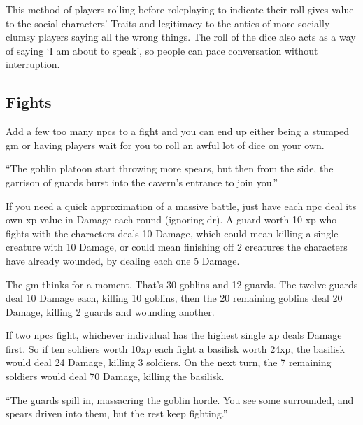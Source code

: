 \begin{multicols}{2}
This method of players rolling before roleplaying to indicate their roll gives value to the social characters' Traits and legitimacy to the antics of more socially clumsy players saying all the wrong things.
The roll of the dice also acts as a way of saying `I am about to speak', so people can pace conversation without interruption.

\subsection{ Fights}

Add a few too many \glspl{npc} to a fight and you can end up either being a stumped \gls{gm} or having players wait for you to roll an awful lot of dice on your own.

\begin{exampletext}

	``The goblin platoon start throwing more spears, but then from the side, the garrison of guards burst into the cavern's entrance to join you.''

\end{exampletext}

If you need a quick approximation of a massive battle, just have each \gls{npc} deal its own \gls{xp} value in Damage each round (ignoring \gls{dr}).
A guard worth 10 \gls{xp} who fights with the characters deals 10 Damage, which could mean killing a single creature with 10 Damage, or could mean finishing off 2 creatures the characters have already wounded, by dealing each one 5 Damage.

\begin{exampletext}

	The \gls{gm} thinks for a moment.
	That's 30 goblins and 12 guards.
	The twelve guards deal 10 Damage each, killing 10 goblins, then the 20 remaining goblins deal 20 Damage, killing 2 guards and wounding another.

\end{exampletext}

If two \glspl{npc} fight, whichever individual has the highest single \gls{xp} deals Damage first.
So if ten soldiers worth 10\gls{xp} each fight a basilisk worth 24\gls{xp}, the basilisk would deal 24 Damage, killing 3 soldiers.
On the next turn, the 7 remaining soldiers would deal 70 Damage, killing the basilisk.

\begin{exampletext}

	``The guards spill in, massacring the goblin horde.
	You see some surrounded, and spears driven into them, but the rest keep fighting.''


\end{exampletext}
\end{multicols}
